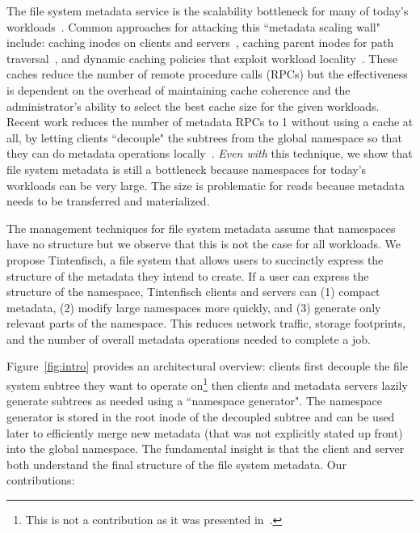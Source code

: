 The file system metadata service is the scalability bottleneck for many of
today's workloads~\cite{roselli:atec2000-FS-workloads,
abad:techreport2012-fstrace, abad:ucc2012-mimesis,
alam:pdsw2011-metadata-scaling, weil:osdi2006-ceph}.  Common approaches for
attacking this ``metadata scaling wall" include: caching inodes on clients and
servers~\cite{depardon:tech13-survey, sinnamohideen:atc2010-ursa,
hildebrand:msst2005-pnfs, devulapalli:ipdps07-pvfs2, welch:fast2008-panasas},
caching parent inodes for path traversal~\cite{patil:fast2011-giga+,
ren:sc2014-indexfs, brandt:msst2003-lh, weil:sc2004-dyn-metadata,
ren:sc2014-indexfs}, and dynamic caching policies that exploit workload
locality~\cite{xing:sc2009-skyfs, zhu:pds2008-hba, li:msst2006-dynamic}.  These
caches reduce the number of remote procedure calls (RPCs) but the effectiveness
is dependent on the overhead of maintaining cache coherence and the
administrator's ability to select the best cache size for the given workloads.
Recent work reduces the number of metadata RPCs to 1 without using a cache at
all, by letting clients ``decouple" the subtrees from the global namespace so
that they can do metadata operations locally~\cite{zheng:pdsw2015-deltafs,
sevilla:ipdps18-cudele}. {\it Even with} this technique, we show that file
system metadata is still a bottleneck because namespaces for today's workloads
can be very large. The size is problematic for reads because metadata needs to
be transferred and materialized.

The management techniques for file system metadata assume that namespaces have
no structure but we observe that this is not the case for all workloads. We
propose Tintenfisch, a file system that allows users to succinctly express the
structure of the metadata they intend to create.  If a user can express the
structure of the namespace, Tintenfisch clients and servers can (1) compact
metadata, (2) modify large namespaces more quickly, and (3) generate only
relevant parts of the namespace. This reduces network traffic, storage
footprints, and the number of overall metadata operations needed to complete a
job. 

Figure~\ref{fig:intro} provides an architectural overview: clients first
decouple the file system subtree they want to operate on\footnote{This is not a
contribution as it was presented in~\cite{sevilla:ipdps18-cudele}.} then
clients and metadata servers lazily generate subtrees as needed using a
``namespace generator". The namespace generator is stored in the root inode of
the decoupled subtree and can be used later to efficiently merge new metadata
(that was not explicitly stated up front) into the global namespace.  The
fundamental insight is that the client and server both understand the final
structure of the file system metadata. Our contributions:

